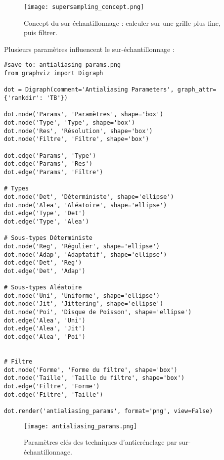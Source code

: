 \documentclass{article}
\begin{document}
\begin{figure}[H]
\centering
\texttt{[image: supersampling\_concept.png]}
\caption{Concept du sur-échantillonnage : calculer sur une grille plus fine, puis filtrer.}
\label{fig:supersampling_concept}
\end{figure}

Plusieurs paramètres influencent le sur-échantillonnage :

\begin{verbatim}
#save_to: antialiasing_params.png
from graphviz import Digraph

dot = Digraph(comment='Antialiasing Parameters', graph_attr={'rankdir': 'TB'})

dot.node('Params', 'Paramètres', shape='box')
dot.node('Type', 'Type', shape='box')
dot.node('Res', 'Résolution', shape='box')
dot.node('Filtre', 'Filtre', shape='box')

dot.edge('Params', 'Type')
dot.edge('Params', 'Res')
dot.edge('Params', 'Filtre')

# Types
dot.node('Det', 'Déterministe', shape='ellipse')
dot.node('Alea', 'Aléatoire', shape='ellipse')
dot.edge('Type', 'Det')
dot.edge('Type', 'Alea')

# Sous-types Déterministe
dot.node('Reg', 'Régulier', shape='ellipse')
dot.node('Adap', 'Adaptatif', shape='ellipse')
dot.edge('Det', 'Reg')
dot.edge('Det', 'Adap')

# Sous-types Aléatoire
dot.node('Uni', 'Uniforme', shape='ellipse')
dot.node('Jit', 'Jittering', shape='ellipse')
dot.node('Poi', 'Disque de Poisson', shape='ellipse')
dot.edge('Alea', 'Uni')
dot.edge('Alea', 'Jit')
dot.edge('Alea', 'Poi')


# Filtre
dot.node('Forme', 'Forme du filtre', shape='box')
dot.node('Taille', 'Taille du filtre', shape='box')
dot.edge('Filtre', 'Forme')
dot.edge('Filtre', 'Taille')

dot.render('antialiasing_params', format='png', view=False)
\end{verbatim}

\begin{figure}[H]
\centering
\texttt{[image: antialiasing\_params.png]}
\caption{Paramètres clés des techniques d'anticrénelage par sur-échantillonnage.}
\label{fig:antialiasing_params}
\end{figure}
\end{document}
